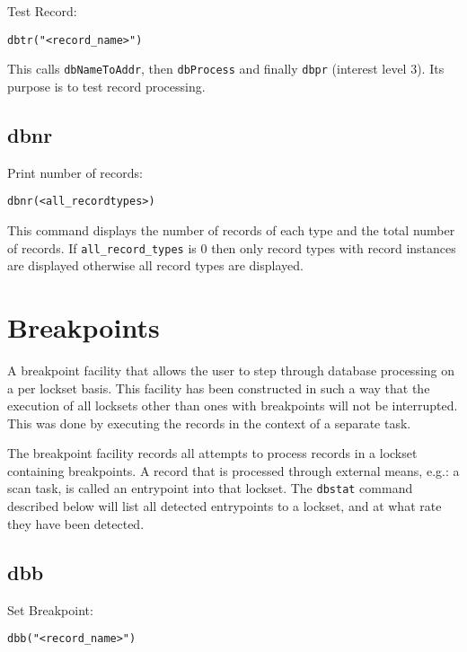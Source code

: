Test Record:

\begin{verbatim}
dbtr("<record_name>")
\end{verbatim}

This calls \verb|dbNameToAddr|, then \verb|dbProcess| and finally \verb|dbpr| (interest level 3). Its purpose is to test record processing.

\subsection{dbnr}

Print number of records:

\begin{verbatim}
dbnr(<all_recordtypes>)
\end{verbatim}

This command displays the number of records of each type and the total number of records. If \verb|all_record_types| is 
0 then only record types with record instances are displayed otherwise all record types are displayed.

\section{Breakpoints}

A breakpoint facility that allows the user to step through database processing on a per lockset basis. This facility has been 
constructed in such a way that the execution of all locksets other than ones with breakpoints will not be interrupted. This 
was done by executing the records in the context of a separate task.

The breakpoint facility records all attempts to process records in a lockset containing breakpoints. A record that is 
processed through external means, e.g.: a scan task, is called an entrypoint into that lockset. The \verb|dbstat| command 
described below will list all detected entrypoints to a lockset, and at what rate they have been detected.

\subsection{dbb}

Set Breakpoint:

\begin{verbatim}
dbb("<record_name>")
\end{verbatim}

